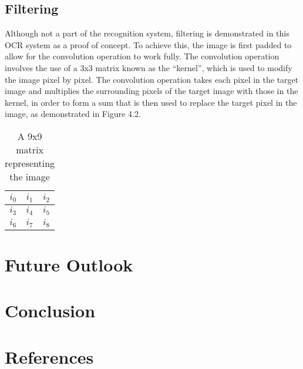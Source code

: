 \documentclass{article}
\begin{document}
\begin{multicols}{2}
\subsection{Filtering}
Although not a part of the recognition system, filtering is demonstrated in this OCR system as a proof of concept. To achieve this, the image is first padded to allow for the convolution operation to work fully. The convolution operation involves the use of a 3x3 matrix known as the “kernel”, which is used to modify the image pixel by pixel. The convolution operation takes each pixel in the target image and multiplies the surrounding pixels of the target image with those in the kernel, in order to form a sum that is then used to replace the target pixel in the image, as demonstrated in Figure 4.2. \par
\begin{table}
\begin{tabular}{ |c|c|c| } 
    \hline
    \(i_0\) & \(i_1\) & \(i_2\) \\
    \hline
    \(i_3\) & \(i_4\) & \(i_5\) \\ 
    \hline
    \(i_6\) & \(i_7\) & \(i_8\) \\ 
    \hline
\end{tabular}
\caption{A 9x9 matrix representing the image}
\label{Figure 4.2}
\end{table}


\section{Future Outlook}

\section{Conclusion}

\section{References}

\end{multicols}
\end{document}
